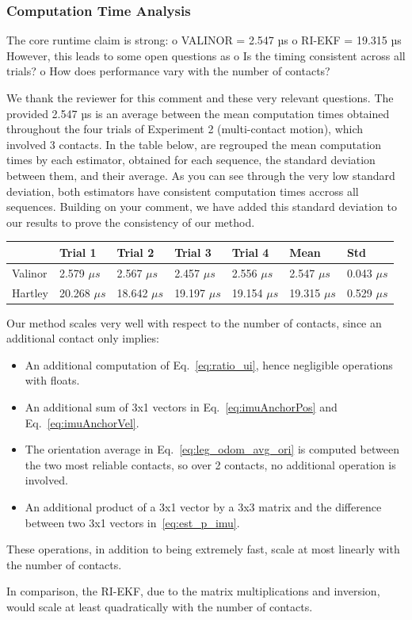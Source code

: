 \subsubsection{Computation Time Analysis}

\begin{revquote}
The core runtime claim is strong:
      o VALINOR = 2.547 µs
      o RI-EKF = 19.315 µs
However, this leads to some open questions as
      o Is the timing consistent across all trials?
      o How does performance vary with the number of contacts?
    
\end{revquote}

We thank the reviewer for this comment and these very relevant questions. The provided 2.547 µs is an average between the mean computation times obtained throughout the four trials of Experiment 2 (multi-contact motion), which involved 3 contacts. In the table below, are regrouped the mean computation times by each estimator, obtained for each sequence, the standard deviation between them, and their average. As you can see through the very low standard deviation, both estimators have consistent computation times accross all sequences. 
Building on your comment, we have added this standard deviation to our results to prove the consistency of our method.

\begin{table}[!h]
  \begin{center}
        \begin{tabu}to\linewidth{| X[c] | X[c] | X[c] | X[c] | X[c] | X[c] | X[c] | }
            \hline
              & Trial 1 & Trial 2 & Trial 3 & Trial 4 & Mean & Std \\
            \hline
             Valinor & 2.579 $\mu s$  & 2.567 $\mu s$  & 2.457 $\mu s$  & 2.556 $\mu s$  & 2.547 $\mu s$ & 0.043 $\mu s$ \\
             \hline 
             Hartley & 20.268 $\mu s$ & 18.642 $\mu s$ & 19.197 $\mu s$ & 19.154 $\mu s$ & 19.315 $\mu s$ & 0.529 $\mu s$ \\
            \hline     
        \end{tabu}
    \end{center}
\end{table}

Our method scales very well with respect to the number of contacts, since an additional contact only implies:
\begin{itemize}
  \item An additional computation of Eq.~\eqref{eq:ratio_ui}, hence negligible operations with floats.
  \item An additional sum of 3x1 vectors in Eq.~\eqref{eq:imuAnchorPos} and Eq.~\eqref{eq:imuAnchorVel}.
  \item The orientation average in Eq.~\eqref{eq:leg_odom_avg_ori} is computed between the two most reliable contacts, so over 2 contacts, no additional operation is involved. 
  \item An additional product of a 3x1 vector by a 3x3 matrix and the difference between two 3x1 vectors in~\eqref{eq:est_p_imu}.
\end{itemize}

These operations, in addition to being extremely fast, scale at most linearly with the number of contacts.


In comparison, the RI-EKF, due to the matrix multiplications and inversion, would scale at least quadratically with the number of contacts.

